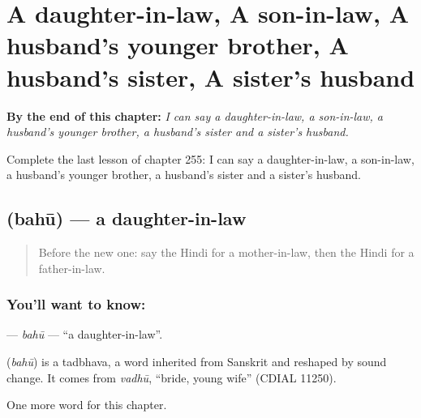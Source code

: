 
\chapter{A daughter-in-law, A son-in-law, A husband's younger brother, A husband's sister, A sister's husband}
\label{ch:hi-a-daughter-in-law-a-son-in-law-a-husband-s-younger-brother-a-husband-s-sister-a-sister-s-husband}

\begin{chapteropening}
\textbf{By the end of this chapter:} \emph{I can say a daughter-in-law, a son-in-law, a husband's younger brother, a husband's sister and a sister's husband.}

Complete the last lesson of chapter 255: I can say a daughter-in-law, a son-in-law, a husband's younger brother, a husband's sister and a sister's husband.
\end{chapteropening}

\section[\texorpdfstring{\hi{बहू} (bahū)}{बहू (bahū)}]{ (bahū) — a daughter-in-law}

\label{lesson:HI-C255-bahu}



\begin{quote}
Before the new one: say the Hindi for a mother-in-law, then the Hindi for a father-in-law.
\end{quote}

\subsection*{You'll want to know: }
\textbf{} — \emph{bahū} — \textquotedblleft{}a daughter-in-law\textquotedblright{}.

\begin{cousinweb}
\textbf{} (\emph{bahū}) is a tadbhava, a word inherited from Sanskrit and reshaped by sound change. It comes from \emph{vadhū}, \textquotedblleft{}bride, young wife\textquotedblright{} (CDIAL 11250).
\end{cousinweb}

\begin{grammarlens}[title={What you've built}]
One more word for this chapter.
\end{grammarlens}

